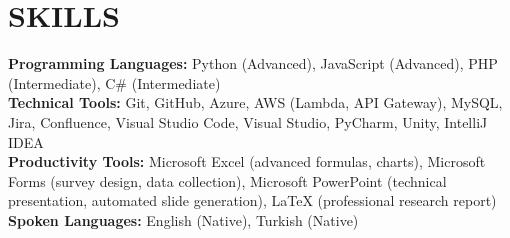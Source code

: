 \vspace{0.1cm}
\section{SKILLS}
    \vspace{0.18cm}
    \begin{onecolentry}
        \textbf{Programming Languages:} Python (Advanced), JavaScript (Advanced), PHP (Intermediate), C\# (Intermediate)\\
        \textbf{Technical Tools:} Git, GitHub, Azure, AWS (Lambda, API Gateway), MySQL, Jira, Confluence, Visual Studio Code, Visual Studio,  PyCharm, Unity, IntelliJ IDEA\\
        \textbf{Productivity Tools:} Microsoft Excel (advanced formulas, charts), Microsoft Forms (survey design, data collection), Microsoft PowerPoint (technical presentation, automated slide generation), LaTeX (professional research report)\\
        \textbf{Spoken Languages:} English (Native), Turkish (Native)\\
    \end{onecolentry}